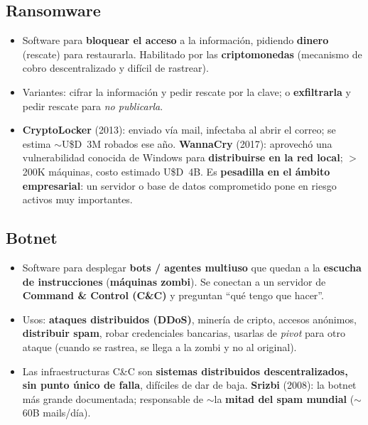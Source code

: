 \documentclass[11pt,a4paper]{article}
\begin{document}
\subsection{Ransomware}
\begin{itemize}[leftmargin=1.4em,itemsep=1pt]
  \item Software para \textbf{bloquear el acceso} a la información, pidiendo \textbf{dinero}
        (rescate) para restaurarla. Habilitado por las \textbf{criptomonedas} (mecanismo de cobro
        descentralizado y difícil de rastrear).
  \item Variantes: cifrar la información y pedir rescate por la clave; o \textbf{exfiltrarla} y
        pedir rescate para \emph{no publicarla}.
  \item \textbf{CryptoLocker} (2013): enviado vía mail, infectaba al abrir el correo; se estima
        $\sim$U\$D~3M robados ese año. \textbf{WannaCry} (2017): aprovechó una vulnerabilidad
        conocida de Windows para \textbf{distribuirse en la red local}; $>$200K máquinas, costo
        estimado U\$D~4B. Es \textbf{pesadilla en el ámbito empresarial}: un servidor o base de
        datos comprometido pone en riesgo activos muy importantes.
\end{itemize}

\subsection{Botnet}
\begin{itemize}[leftmargin=1.4em,itemsep=1pt]
  \item Software para desplegar \textbf{bots / agentes multiuso} que quedan a la
        \textbf{escucha de instrucciones} (\textbf{máquinas zombi}). Se conectan a un servidor de
        \textbf{Command \& Control (C\&C)} y preguntan ``qué tengo que hacer''.
  \item Usos: \textbf{ataques distribuidos (DDoS)}, minería de cripto, accesos anónimos,
        \textbf{distribuir spam}, robar credenciales bancarias, usarlas de \emph{pivot} para otro
        ataque (cuando se rastrea, se llega a la zombi y no al original).
  \item Las infraestructuras C\&C son \textbf{sistemas distribuidos descentralizados, sin punto
        único de falla}, difíciles de dar de baja. \textbf{Srizbi} (2008): la botnet más grande
        documentada; responsable de $\sim$la \textbf{mitad del spam mundial} ($\sim$60B mails/día).
\end{itemize}
\end{document}

